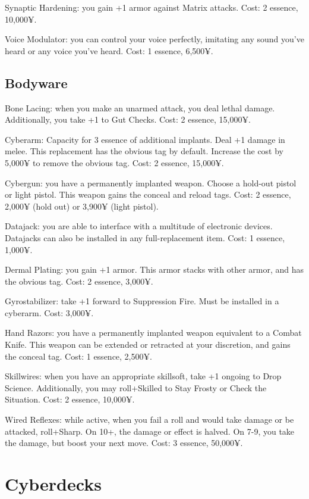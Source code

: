 Synaptic Hardening: you gain +1 armor against Matrix attacks. Cost: 2 essence, 10,000¥.

Voice Modulator: you can control your voice perfectly, imitating any sound you’ve heard or any voice you’ve heard. Cost: 1 essence, 6,500¥.


\subsection{Bodyware}

Bone Lacing: when you make an unarmed attack, you deal lethal damage. Additionally, you take +1 to Gut Checks. Cost: 2 essence, 15,000¥.

Cyberarm: Capacity for 3 essence of additional implants. Deal +1 damage in melee. This replacement has the obvious tag by default. Increase the cost by 5,000¥ to remove the obvious tag. Cost: 2 essence, 15,000¥.

Cybergun: you have a permanently implanted weapon. Choose a hold-out pistol or light pistol. This weapon gains the conceal and reload tags. Cost: 2 essence, 2,000¥ (hold out) or 3,900¥ (light pistol).

Datajack: you are able to interface with a multitude of electronic devices. Datajacks can also be installed in any full-replacement item. Cost: 1 essence, 1,000¥.

Dermal Plating: you gain +1 armor. This armor stacks with other armor, and has the obvious tag. Cost: 2 essence, 3,000¥.

Gyrostabilizer: take +1 forward to Suppression Fire. Must be installed in a cyberarm. Cost: 3,000¥.

Hand Razors: you have a permanently implanted weapon equivalent to a Combat Knife. This weapon can be extended or retracted at your discretion, and gains the conceal tag. Cost: 1 essence, 2,500¥.

Skillwires: when you have an appropriate skillsoft, take +1 ongoing to Drop Science. Additionally, you may roll+Skilled to Stay Frosty or Check the Situation. Cost: 2 essence, 10,000¥.

Wired Reflexes: while active, when you fail a roll and would take damage or be attacked, roll+Sharp. On 10+, the damage or effect is halved. On 7-9, you take the damage, but boost your next move. Cost: 3 essence, 50,000¥.



\section{Cyberdecks}

